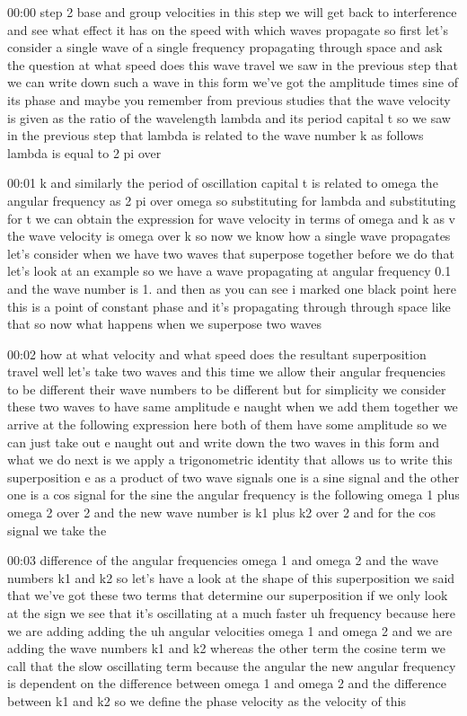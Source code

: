 00:00
step 2 base and group velocities in this step we will get back to
interference and see what effect it has on the speed with which waves propagate
so first let's consider a single wave of a single frequency
propagating through space and ask the question
at what speed does this wave travel we saw in the previous step that we can
write down such a wave in this form we've got the amplitude times sine of
its phase and maybe you remember from previous studies
that the wave velocity is given as the ratio of the
wavelength lambda and its period capital t so we saw in the previous step that
lambda is related to the wave number k as follows lambda is equal to 2 pi over

00:01
k and similarly the period of oscillation capital t is related to omega
the angular frequency as 2 pi over omega so substituting for lambda and
substituting for t we can obtain the expression for wave velocity
in terms of omega and k as v the wave velocity is omega over k
so now we know how a single wave propagates let's consider when we have
two waves that superpose together before we do that let's look at an
example so we have a wave propagating at angular frequency 0.1
and the wave number is 1. and then as you can see i marked one black point here
this is a point of constant phase and it's propagating
through through space like that so now what happens when we superpose two waves

00:02
how at what velocity and what speed does the resultant superposition travel
well let's take two waves and this time we allow their angular frequencies to be
different their wave numbers to be different but
for simplicity we consider these two waves to have same amplitude e naught
when we add them together we arrive at the
following expression here both of them have some amplitude so
we can just take out e naught out and write down the two waves in this form
and what we do next is we apply a trigonometric identity that
allows us to write this superposition e as a product
of two wave signals one is a sine signal and the other one is a cos signal
for the sine the angular frequency is the following omega 1 plus omega 2 over 2
and the new wave number is k1 plus k2 over 2 and for the cos signal we take the

00:03
difference of the angular frequencies omega 1 and omega 2 and the wave numbers
k1 and k2 so let's have a look at the shape of this superposition
we said that we've got these two terms that determine
our superposition if we only look at the sign
we see that it's oscillating at a much faster
uh frequency because here we are adding adding the uh angular velocities omega
1 and omega 2 and we are adding the wave numbers
k1 and k2 whereas the other term the cosine term we call that the slow
oscillating term because the angular the new angular frequency is dependent
on the difference between omega 1 and omega 2 and the difference between k1
and k2 so we define the phase velocity as the velocity of this

